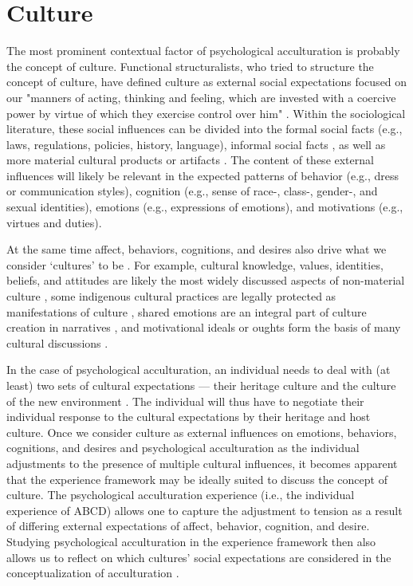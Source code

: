\documentclass[man, 12pt, a4paper]{apa7}
\begin{document}
\section{Culture} 
The most prominent contextual factor of psychological acculturation is probably the concept of culture. Functional structuralists, who tried to structure the concept of culture, have defined culture as external social expectations focused on our "manners of acting, thinking and feeling, which are invested with a coercive power by virtue of which they exercise control over him" \citep[][p. 52; on social facts]{Durkheim1982, Gilbert1989}. Within the sociological literature, these social influences can be divided into the formal social facts (e.g., laws, regulations, policies, history, language), informal social facts \citep[e.g., norms, values, beliefs, rituals, customs; also see][]{Herzog2018}, as well as more material cultural products or artifacts \citep[e.g., food, fashion, architecture, or arts, such as film, music, literature, and fine arts; e.g., see][]{Alexander2001}. The content of these external influences will likely be relevant in the expected patterns of behavior (e.g., dress or communication styles), cognition (e.g., sense of race-, class-, gender-, and sexual identities), emotions (e.g., expressions of emotions), and motivations (e.g., virtues and duties).

At the same time affect, behaviors, cognitions, and desires also drive what we consider `cultures' to be \citep[e.g.,][]{Varnum2017}. For example, cultural knowledge, values, identities, beliefs, and attitudes are likely the most widely discussed aspects of non-material culture \citep[e.g.,][]{DiMaggio1997}, some indigenous cultural practices are legally protected as manifestations of culture \citep[Art. 11]{UnitedNations2007}, shared emotions are an integral part of culture creation in narratives \citep[e.g.,][]{Ahmed2014, Kitayama1994, Smith2016c, Sundararajan2015}, and motivational ideals or oughts form the basis of many cultural discussions \citep[e.g., see][]{Markus1991}.

In the case of psychological acculturation, an individual needs to deal with (at least) two sets of cultural expectations --- their heritage culture and the culture of the new environment \citep[e.g., see models of][]{Berry1997b, Berry2006a}. The individual will thus have to negotiate their individual response to the cultural expectations by their heritage and host culture. Once we consider culture as external influences on emotions, behaviors, cognitions, and desires and psychological acculturation as the individual adjustments to the presence of multiple cultural influences, it becomes apparent that the experience framework may be ideally suited to discuss the concept of culture. The psychological acculturation experience (i.e., the individual experience of ABCD) allows one to capture the adjustment to tension as a result of differing external expectations of affect, behavior, cognition, and desire. Studying psychological acculturation in the experience framework then also allows us to reflect on which cultures' social expectations are considered in the conceptualization of acculturation \citep{Bhatia2001}. 
\end{document}

